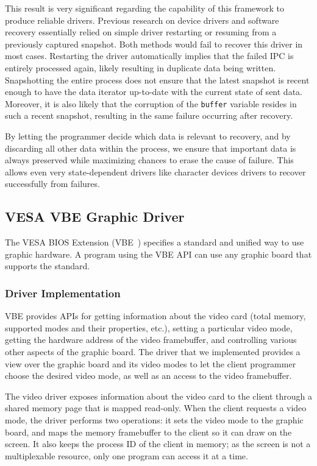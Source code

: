 \documentclass[times, 10pt, twocolumn]{article}
\begin{document}
This result is very significant regarding the capability of this framework to produce reliable drivers. Previous research on device drivers and software recovery essentially relied on simple driver restarting or resuming from a previously captured snapshot. Both methods would fail to recover this driver in most cases. Restarting the driver automatically implies that the failed IPC is entirely processed again, likely resulting in duplicate data being written. Snapshotting the entire process does not ensure that the latest snapshot is recent enough to have the data iterator up-to-date with the current state of sent data. Moreover, it is also likely that the corruption of the \texttt{buffer} variable resides in such a recent snapshot, resulting in the same failure occurring after recovery.

By letting the programmer decide which data is relevant to recovery, and by discarding all other data within the process, we ensure that important data is always preserved while maximizing chances to erase the cause of failure. This allows even very state-dependent drivers like character devices drivers to recover successfully from failures.

\subsection{VESA VBE Graphic Driver}
The VESA BIOS Extension (VBE~\cite{VBE}) specifies a standard and unified way to use graphic hardware. A program using the VBE API can use any graphic board that supports the standard.

\subsubsection{Driver Implementation}
VBE provides APIs for getting information about the video card (total memory, supported modes and their properties, etc.), setting a particular video mode, getting the hardware address of the video framebuffer, and controlling various other aspects of the graphic board. The driver that we implemented provides a view over the graphic board and its video modes to let the client programmer choose the desired video mode, as well as an access to the video framebuffer.

The video driver exposes information about the video card to the client through a shared memory page that is mapped read-only. When the client requests a video mode, the driver performs two operations: it sets the video mode to the graphic board, and maps the memory framebuffer to the client so it can draw on the screen. It also keeps the process ID of the client in memory; as the screen is not a multiplexable resource, only one program can access it at a time.
\end{document}
